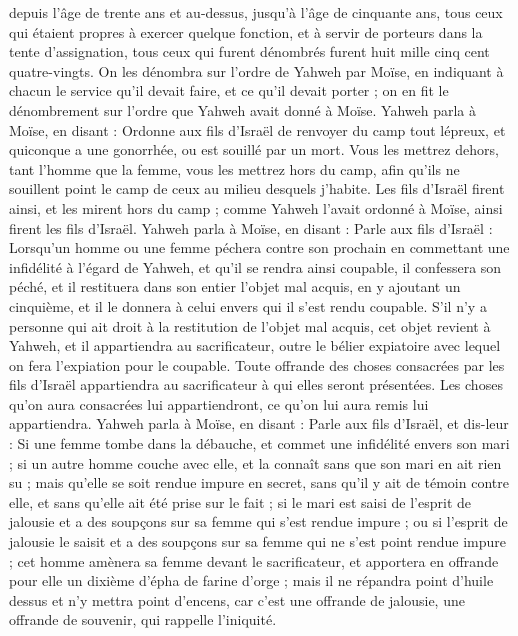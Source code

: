 \begin{multicols}{2}
depuis l'âge de trente ans et au-dessus, jusqu'à l'âge de cinquante ans, tous ceux qui étaient propres à exercer quelque fonction, et à servir de porteurs dans la tente d'assignation,
tous ceux qui furent dénombrés furent huit mille cinq cent quatre-vingts.
On les dénombra sur l’ordre de Yahweh par Moïse, en indiquant à chacun le service qu’il devait faire, et ce qu'il devait porter ; on en fit le dénombrement sur l’ordre que Yahweh avait donné à Moïse.
\VerseOne{}Yahweh parla à Moïse, en disant :
Ordonne aux fils d'Israël de renvoyer du camp tout lépreux, et quiconque a une gonorrhée, ou est souillé par un mort.
Vous les mettrez dehors, tant l'homme que la femme, vous les mettrez hors du camp, afin qu'ils ne souillent point le camp de ceux au milieu desquels j'habite.
Les fils d'Israël firent ainsi, et les mirent hors du camp ; comme Yahweh l’avait ordonné à Moïse, ainsi firent les fils d'Israël.
Yahweh parla à Moïse, en disant :
Parle aux fils d'Israël : Lorsqu’un homme ou une femme péchera contre son prochain en commettant une infidélité à l’égard de Yahweh, et qu’il se rendra ainsi coupable,
il confessera son péché, et il restituera dans son entier l’objet mal acquis, en y ajoutant un cinquième, et il le donnera à celui envers qui il s’est rendu coupable.
S’il n’y a personne qui ait droit à la restitution de l’objet mal acquis, cet objet revient à Yahweh, et il appartiendra au sacrificateur, outre le bélier expiatoire avec lequel on fera l’expiation pour le coupable.
Toute offrande des choses consacrées par les fils d'Israël appartiendra au sacrificateur à qui elles seront présentées.
Les choses qu’on aura consacrées lui appartiendront, ce qu’on lui aura remis lui appartiendra.
Yahweh parla à Moïse, en disant :
Parle aux fils d'Israël, et dis-leur : Si une femme tombe dans la débauche, et commet une infidélité envers son mari ;
si un autre homme couche avec elle, et la connaît sans que son mari en ait rien su ; mais qu'elle se soit rendue impure en secret, sans qu’il y ait de témoin contre elle, et sans qu’elle ait été prise sur le fait ;
si le mari est saisi de l'esprit de jalousie et a des soupçons sur sa femme qui s'est rendue impure ; ou si l'esprit de jalousie le saisit et a des soupçons sur sa femme qui ne s’est point rendue impure ;
cet homme amènera sa femme devant le sacrificateur, et apportera en offrande pour elle un dixième d'épha de farine d'orge ; mais il ne répandra point d'huile dessus et n'y mettra point d'encens, car c'est une offrande de jalousie, une offrande de souvenir, qui rappelle l'iniquité.

\end{multicols}
